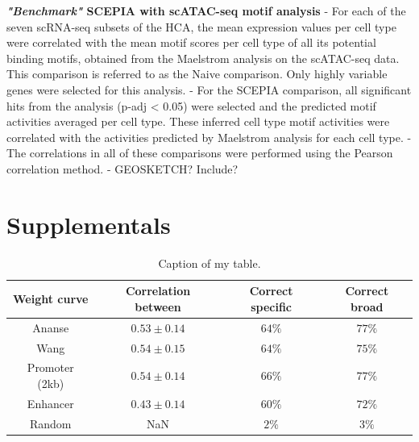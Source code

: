 \textbf{\textit{"Benchmark"} SCEPIA with scATAC-seq motif analysis}
- For each of the seven scRNA-seq subsets of the HCA, the mean expression values per cell type were correlated with the mean motif scores per cell type of all its potential binding motifs, obtained from the Maelstrom analysis on the scATAC-seq data. This comparison is referred to as the Naive comparison. Only highly variable genes were selected for this analysis. 
- For the SCEPIA comparison, all significant hits from the analysis (p-adj < 0.05) were selected and the predicted motif activities averaged per cell type. These inferred cell type motif activities were correlated with the activities predicted by Maelstrom analysis for each cell type. 
- The correlations in all of these comparisons were performed using the Pearson correlation method.
 - GEOSKETCH? Include?

\section{Supplementals}
\beginsupplement
\begin{table}
    \begin{center}
        \begin{tabular}{||c c c c||} 
        \hline
        Weight curve & Correlation between & Correct specific & Correct broad \\[0.5ex] 
        \hline
        Ananse & $0.53 \pm 0.14$ & $64\%$ & $77\%$ \\ 
        \hline
        Wang & $0.54 \pm 0.15 $ & $64\%$ & $75\%$ \\
        \hline
        Promoter (2kb) & $0.54 \pm 0.14$ & $66\%$ & $77\%$ \\
        \hline
        Enhancer & $0.43 \pm 0.14$ & $60\%$ & $72\%$ \\
        \hline
        Random & NaN & $2\%$ & $3\%$ \\
        \hline
        \end{tabular}
        \caption{Caption of my table.}
        \label{table:1}
    \end{center}
\end{table}

